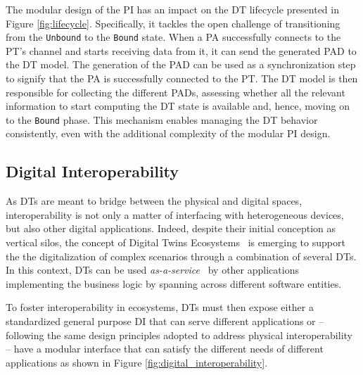 The modular design of the \ac{PI} has an impact on the \ac{DT} lifecycle presented in Figure \ref{fig:lifecycle}.
%
Specifically, it tackles the open challenge of transitioning from the \texttt{Unbound} to the \texttt{Bound} state.
%
When a \ac{PA} successfully connects to the \ac{PT}'s channel and starts receiving data from it, it can send the generated \ac{PAD} to the \ac{DT} model.
The generation of the \ac{PAD} can be used as a synchronization step to signify that the \ac{PA} is successfully connected to the \ac{PT}.
%
The \ac{DT} model is then responsible for collecting the different \acp{PAD}, assessing whether all the relevant information to start computing the \ac{DT} state is available and, hence, moving on to the \texttt{Bound} phase.
%
This mechanism enables managing the \ac{DT} behavior consistently, even with the additional complexity of the modular \ac{PI} design.


\subsection{Digital Interoperability}
\label{sec:digital_interoperability}




As \acp{DT} are meant to bridge between the physical and digital spaces,
interoperability is not only a matter of interfacing with heterogeneous devices, but also other digital applications.
Indeed, despite their initial conception as vertical silos, the concept of Digital Twins Ecosystems~\cite{web-of-dt-ricci-2022,kendall2021ndt} is emerging to support the the digitalization of complex scenarios through a combination of several \acp{DT}.
%
In this context, \acp{DT} can be used \emph{as-a-service}~\cite{liu2022state} by other applications implementing the business logic by spanning across different software entities.

To foster interoperability in ecosystems, \acp{DT} must then expose either a standardized general purpose \acf{DI} that can serve different applications or
-- following the same design principles adopted to address physical interoperability --
have a modular interface that can satisfy the different needs of different applications
as shown in Figure \ref{fig:digital_interoperability}.

